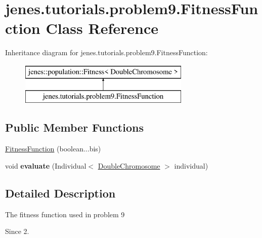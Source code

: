 \hypertarget{classjenes_1_1tutorials_1_1problem9_1_1_fitness_function}{\section{jenes.\-tutorials.\-problem9.\-Fitness\-Function Class Reference}
\label{classjenes_1_1tutorials_1_1problem9_1_1_fitness_function}
}
Inheritance diagram for jenes.\-tutorials.\-problem9.\-Fitness\-Function\-:\begin{figure}[H]
\begin{center}
\leavevmode
\includegraphics[height=2.000000cm]{classjenes_1_1tutorials_1_1problem9_1_1_fitness_function}
\end{center}
\end{figure}
\subsection*{Public Member Functions}
\begin{DoxyCompactItemize}
\item 
\hyperlink{classjenes_1_1tutorials_1_1problem9_1_1_fitness_function_aef303998ee008c836185ea70dd76f9c0}{Fitness\-Function} (boolean...\-bis)
\item 
\hypertarget{classjenes_1_1tutorials_1_1problem9_1_1_fitness_function_a364f000aabc587ab45daf4b951c5cb92}{void {\bfseries evaluate} (Individual$<$ \hyperlink{classjenes_1_1chromosome_1_1_double_chromosome}{Double\-Chromosome} $>$ individual)}\label{classjenes_1_1tutorials_1_1problem9_1_1_fitness_function_a364f000aabc587ab45daf4b951c5cb92}

\end{DoxyCompactItemize}


\subsection{Detailed Description}
The fitness function used in problem 9 \begin{DoxySince}{Since}
2. 
\end{DoxySince}


